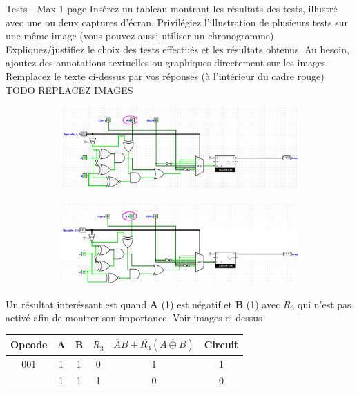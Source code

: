 \documentclass[a4paper]{article}
\begin{document}
\begin{tcolorbox}[colframe=Monokaimagenta,colback=white]
Tests - Max 1 page 
Insérez  un tableau montrant les résultats des tests, illustré avec une ou deux captures d’écran. Privilégiez l’illustration de plusieurs tests sur une même image (vous pouvez aussi utiliser un chronogramme)
Expliquez/justifiez le choix des tests effectués et les résultats obtenus.
Au besoin, ajoutez des annotations textuelles ou graphiques directement sur les images.
Remplacez le texte ci-dessus par vos réponses (à l’intérieur du cadre rouge)\\
TODO REPLACEZ IMAGES
\begin{center}
    
    \begin{figure}[H]
    \centering
    
    \begin{subfigure}{.7\textwidth}
        \centering
        \includegraphics[width=.8\linewidth]{src/COMP_TEST_AgeB.png}
        \label{fig:COMPARATEUR_EXEMPLE}
   \end{subfigure}
   
   \begin{subfigure}{.7\textwidth}
        \centering
        \includegraphics[width=.8\linewidth]{src/COMP_TEST_AgeB1.png}
        \label{fig:COMPARATEUR_EXEMPLE_1}
   \end{subfigure}


\end{figure}
    
    Un résultat interéssant est quand \textbf{A} (1) est négatif et \textbf{B} (1) avec $R_3$ qui n'est pas activé afin de montrer son importance. Voir images ci-dessus
\begin{tabular}{|c|c|c|c|cc|}
\hline
    Opcode & A & B & $R_3$ & $\overline{A} B + \overline{R_3}(\overline{A \oplus B})$ & Circuit\\
   \hline
    001    & 1 & 1 & 0     & 1             & 1 \\           
           & 1 & 1 & 1     & 0             & 0 \\
    \hline
\end{tabular}


\end{center}
\end{tcolorbox}
\end{document}
